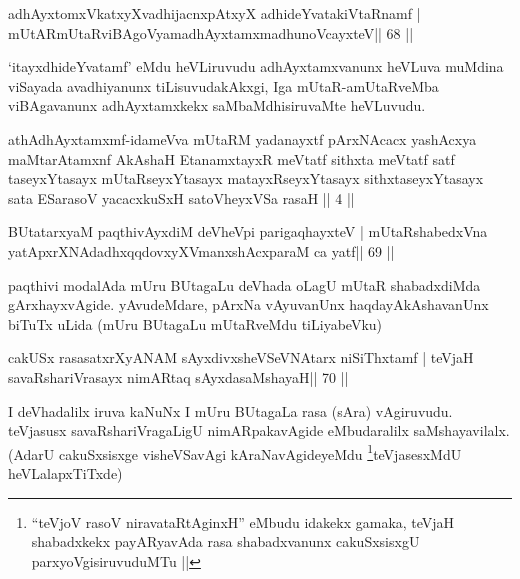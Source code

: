 

\begin{shl}
adhAyxtomxVkatxyXvadhijacnxpAtxyX adhideYvatakiVtaRnamf |
mUtARmUtaRviBAgoV\s yamadhAyxtamxmadhunoVcayxteV\hfill || 68 ||
\end{shl}

\begin{artha}
`itayxdhideYvatamf' eMdu heVLiruvudu adhAyxtamxvanunx heVLuva muMdina  viSayada avadhiyanunx tiLisuvudakAkxgi, Iga mUtaR-amUtaRveMba   viBAgavanunx adhAyxtamxkekx saMbaMdhisiruvaMte heVLuvudu.
\end{artha}

\medskip

\begin{kandikeshl}
athAdhAyxtamxmf-idameVva mUtaRM yadanayxtf pArxNAcacx yashAcxya
maMtarAtamxnf AkAshaH EtanamxtayxR meVtatf sithxta meVtatf satf
taseyxYtasayx mUtaRseyxYtasayx matayxRseyxYtasayx sithxtaseyxYtasayx
sata ESarasoV yacacxkuSxH satoVheyxVSa rasaH || 4 ||
\end{kandikeshl}


\begin{shl}
BUtatarxyaM paqthivAyxdiM deVheV\s pi parigaqhayxteV |
mUtaRshabedxVna yatApxrXNAdadhxqqdovxyXVmanxshAcxparaM ca yatf\hfill || 69 ||
\end{shl}

\begin{artha}
paqthivi modalAda mUru BUtagaLu deVhada oLagU mUtaR shabadxdiMda
gArxhayxvAgide. yAvudeMdare, pArxNa vAyuvanUnx haqdayAkAshavanUnx
biTuTx uLida (mUru BUtagaLu mUtaRveMdu tiLiyabeVku)
\end{artha}



\begin{shl}
cakUSx rasasatxrXyANAM sAyxdivxsheVSeVNAtarx niSiThxtamf |
teVjaH savaRshariVrasayx nimARtaq sAyxdasaMshayaH\hfill || 70 ||
\end{shl}

\begin{artha}
I deVhadalilx iruva kaNuNx I mUru BUtagaLa rasa (sAra) vAgiruvudu.
teVjasusx savaRshariVragaLigU nimARpakavAgide eMbudaralilx
saMshayavilalx. (AdarU cakuSxsisxge visheVSavAgi
kAraNavAgideyeMdu \footnote{``teVjoV rasoV niravataRtAginxH'' eMbudu
  idakekx gamaka, teVjaH shabadxkekx payARyavAda rasa shabadxvanunx
  cakuSxsisxgU parxyoVgisiruvuduMTu ||}teVjasesxMdU heVLalapxTiTxde)
\end{artha}


